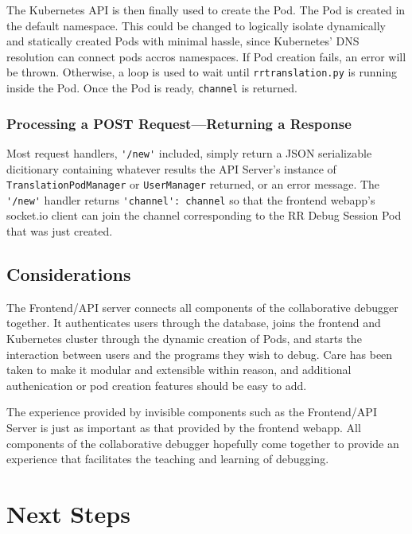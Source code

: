 \documentclass[12pt]{article}
\begin{document}
The Kubernetes API is then finally used to create the Pod.  The Pod is
created in the default namespace.  This could be changed to logically
isolate dynamically and statically created Pods with minimal hassle,
since Kubernetes' DNS resolution can connect pods accros namespaces.
If Pod creation fails, an error will be thrown.  Otherwise, a loop is
used to wait until \lstinline{rrtranslation.py} is running inside the
Pod.  Once the Pod is ready, \lstinline{channel} is returned.

\subsubsection{Processing a POST Request---Returning a Response}

Most request handlers, \lstinline{'/new'} included, simply return a
JSON serializable dicitionary containing whatever results the API
Server's instance of \lstinline{TranslationPodManager} or
\lstinline{UserManager} returned, or an error message.  The
\lstinline{'/new'} handler returns \lstinline{'channel': channel} so
that the frontend webapp's socket.io client can join the channel
corresponding to the RR Debug Session Pod that was just created.

\subsection{Considerations}

The Frontend/API server connects all components of the collaborative
debugger together.  It authenticates users through the database, joins
the frontend and Kubernetes cluster through the dynamic creation of
Pods, and starts the interaction between users and the programs they
wish to debug.  Care has been taken to make it modular and extensible
within reason, and additional authenication or pod creation features
should be easy to add.
\par

The experience provided by invisible components such as the
Frontend/API Server is just as important as that provided by the
frontend webapp.  All components of the collaborative debugger
hopefully come together to provide an experience that facilitates the
teaching and learning of debugging.

\section{Next Steps} \label{next}
\end{document}
